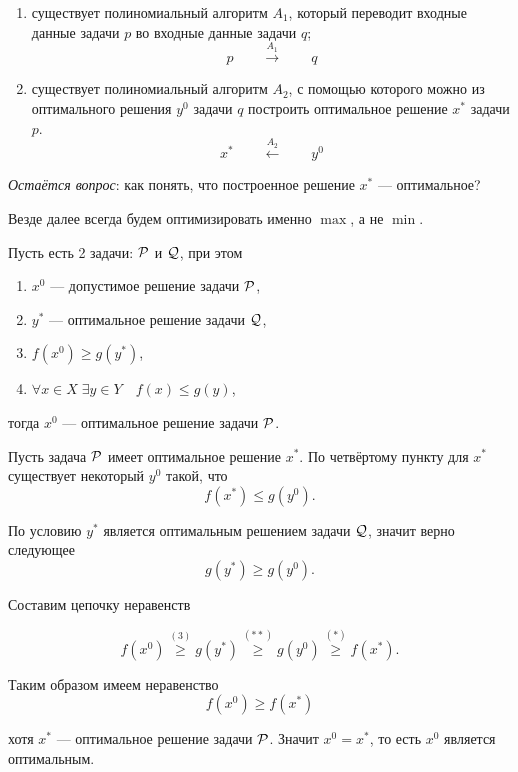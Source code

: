 \begin{enumerate}[nosep]
	\item существует полиномиальный алгоритм $A_1$, который переводит входные данные задачи $p$ во входные данные задачи $q$;
	\[
		p \qquad \stackrel{A_1}{\longrightarrow} \qquad q
	\]
	
	\item существует полиномиальный алгоритм $A_2$, с помощью которого можно из оптимального решения $y^0$ задачи $q$ построить оптимальное решение $x^*$ задачи $p$.
	\[
		x^* \qquad \stackrel{A_2}{\longleftarrow} \qquad y^0
	\]
\end{enumerate}

\textit{Остаётся вопрос}: как понять, что построенное решение $x^*$ --- оптимальное?

\remark

Везде далее всегда будем оптимизировать именно $\max$, а не $\min$.

\label{fact:reduction_to_other_problem}

Пусть есть 2 задачи: $\P$ и $\Q$, при этом
\begin{enumerate}[nosep]
	\item $x^0$ --- допустимое решение задачи $\P$,
	
	\item $y^*$ --- оптимальное решение задачи $\Q$,
	
	\item $f(x^0) \ge g(y^*)$,
	
	\item $\forall x \in X \; \exists y \in Y \quad f(x) \le g(y)$,
\end{enumerate}

тогда $x^0$ --- оптимальное решение задачи $\P$.

\prooof

Пусть задача $\P$ имеет оптимальное решение $x^*$. По четвёртому пункту для $x^*$ существует некоторый $y^0$ такой, что 
\[
	f(x^*) \le g(y^0). \tag{*}
\]

По условию $y^*$ является оптимальным решением задачи $\Q$, значит верно следующее
\[
	g(y^*) \ge g(y^0). \tag{**}
\]

Составим цепочку неравенств

\[
	f(x^0) \stackrel{(3)}{\ge} g(y^*) \stackrel{(**)}{\ge} g(y^0) \stackrel{(*)}{\ge} f(x^*).
\]

Таким образом имеем неравенство
\[
	f(x^0) \ge f(x^*)
\]

хотя $x^*$ --- оптимальное решение задачи $\P$. Значит $x^0 = x^*$, то есть $x^0$ является оптимальным.

